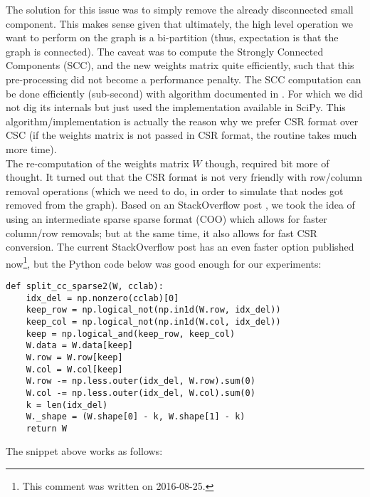 The solution for this issue was to simply remove the already
disconnected small component. This makes sense given that ultimately,
the high level operation we want to perform on the graph is a
bi-partition (thus, expectation is that the graph is connected). The
caveat was to compute the Strongly Connected Components (\gls{SCC}), and the
new weights matrix quite efficiently, such that this pre-processing
did not become a performance penalty. The \gls{SCC} computation can be done
efficiently (sub-second) with algorithm documented in \cite{pearce05}.
For which we did not dig its internals but just used the
implementation available in SciPy. This  
algorithm/implementation is actually the reason why we prefer CSR
format over CSC (if the weights matrix is not passed in CSR format,
the routine takes much more time). \\

\newpage
The re-computation of the weights matrix $W$ though, required bit more
of thought. It turned out that the CSR format is not very friendly
with row/column removal operations (which we need to do, in order to
simulate that nodes got removed from the graph). Based on an
StackOverflow post \cite{alim15}, we took the idea of using an
intermediate sparse sparse format (COO) which allows for faster
column/row removals; but at the same time, it also allows for fast CSR
conversion. The current StackOverflow post has an even faster option
published now\footnote{This comment was written on 2016-08-25.}, but the
Python code below was good enough for our experiments: 

    \begin{lstlisting}
def split_cc_sparse2(W, cclab):
    idx_del = np.nonzero(cclab)[0]
    keep_row = np.logical_not(np.in1d(W.row, idx_del))
    keep_col = np.logical_not(np.in1d(W.col, idx_del))
    keep = np.logical_and(keep_row, keep_col)
    W.data = W.data[keep]
    W.row = W.row[keep]
    W.col = W.col[keep]
    W.row -= np.less.outer(idx_del, W.row).sum(0)
    W.col -= np.less.outer(idx_del, W.col).sum(0)
    k = len(idx_del)
    W._shape = (W.shape[0] - k, W.shape[1] - k)
    return W
    \end{lstlisting}
    \joinbelow{1cm}
    
The snippet above works as follows: \\

